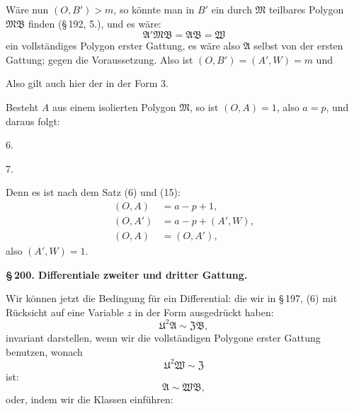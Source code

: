 Wäre nun $(O, B') > m$, so könnte man in $B'$ ein durch $\mathfrak{M}$
teilbares Polygon $\mathfrak{M}\mathfrak{B}$ finden (\S\,192, 5.), und es wäre:
\[
\mathfrak{A}' \mathfrak{M} \mathfrak{B} = \mathfrak{A} \mathfrak{B} = \mathfrak{W}
\]
ein vollständiges Polygon erster Gattung, es wäre also $\mathfrak{A}$ selbst
von der ersten Gattung; gegen die Voraussetzung. Also ist
$(O, B') = (A', W) = m$ und

Also gilt auch hier der  in der
Form 3.

Besteht $A$ aus einem isolierten Polygon $\mathfrak{M}$, so ist $(O, A) = 1$,
also $a = p$, und daraus folgt:

6. 

7. 

Denn es ist nach dem Satz (6) und (15):
\[
\begin{aligned}
(O, A) &= a - p + 1, \\
(O, A') &= a - p + (A', W), \\
(O, A) &= (O, A'),
\end{aligned}
\]
also $(A', W) = 1$.

\begin{center}
\textbf{\S\,200. Differentiale zweiter und dritter Gattung.}
\end{center}
Wir können jetzt die Bedingung für ein Differential:
die wir in \S\,197, (6) mit Rücksicht auf eine Variable $z$ in der
Form ausgedrückt haben:
\[
\mathfrak{U}^2 \mathfrak{A} \sim \mathfrak{Z} \mathfrak{B},
\]
invariant darstellen, wenn wir die vollständigen Polygone erster
Gattung benutzen, wonach
\[
\mathfrak{U}^2 \mathfrak{W} \sim \mathfrak{Z}
\]
ist:
\[
\mathfrak{A} \sim \mathfrak{W} \mathfrak{B},
\]
oder, indem wir die Klassen einführen:
